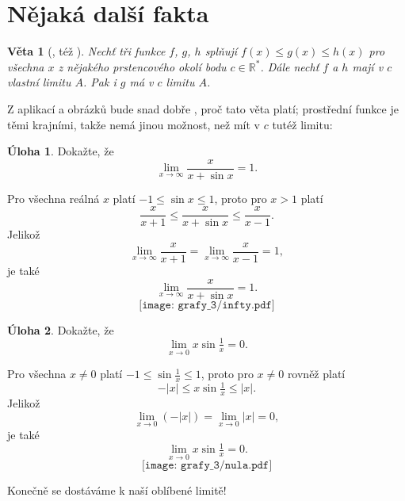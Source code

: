 \documentclass[12pt,a4paper]{article}
\newcommand{\R}{\mathbb R}
\newtheorem*{veta}{Věta}
\theoremstyle{definition}
\newtheorem{uloha}{Úloha}
\newenvironment{res}{\proof}{\endproof}
\begin{document}
\renewcommand*{\proofname}{Řešení}

\section*{Nějaká další fakta}

\begin{veta}[, též ]
Nechť tři funkce $f$, $g$, $h$ splňují $f(x) \leq g(x) \leq h(x)$ pro všechna $x$ z nějakého prstencového okolí bodu $c \in \R^*$. Dále nechť $f$ a $h$ mají v $c$ vlastní limitu $A$. Pak i $g$ má v $c$ limitu $A$.
\end{veta}

Z aplikací a obrázků bude snad dobře , proč tato věta platí; prostřední funkce je  těmi krajními, takže nemá jinou možnost, než mít v $c$ tutéž limitu:

\begin{uloha}
Dokažte, že
\[ \lim_{x \to \infty} \frac{x}{x + \sin x} = 1. \]
\end{uloha}
\begin{res}
Pro všechna reálná $x$ platí $-1 \leq \sin x \leq 1$, proto pro $x > 1$ platí
\[ \frac{x}{x + 1} \leq \frac{x}{x + \sin x} \leq \frac{x}{x - 1}. \]
Jelikož
\[ \lim_{x \to \infty} \frac{x}{x + 1} = \lim_{x \to \infty} \frac{x}{x - 1} = 1, \]
je také
\[ \lim_{x \to \infty} \frac{x}{x + \sin x} = 1. \]
\[ \texttt{[image: grafy\_3/infty.pdf]} \]
\end{res}


\begin{uloha}
Dokažte, že
\[ \lim_{x \to 0} x \sin \tfrac 1x = 0. \]
\end{uloha}
\begin{res}
Pro všechna $x \neq 0$ platí $-1 \leq \sin \frac 1x \leq 1$, proto pro $x \neq 0$ rovněž platí
\[ -|x| \leq x \sin \tfrac 1x \leq |x|. \]
Jelikož
\[ \lim_{x \to 0} (-|x|) = \lim_{x \to 0} |x| = 0, \]
je také
\[ \lim_{x \to 0} x \sin \tfrac 1x = 0. \]
\[ \texttt{[image: grafy\_3/nula.pdf]} \]
\end{res}

Konečně se dostáváme k naší oblíbené limitě!
\end{document}
